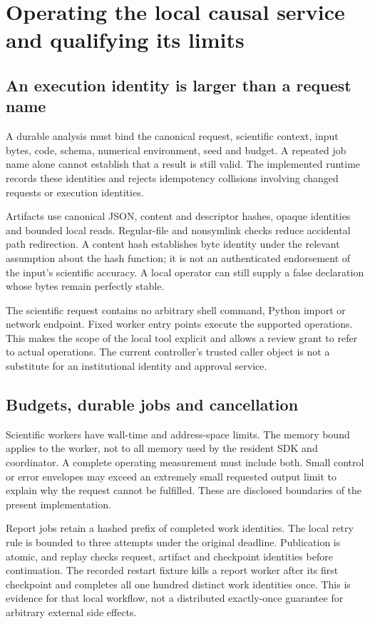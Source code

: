 \chapter{Operating the local causal service and qualifying its limits}
\label{in:operations}

\section{An execution identity is larger than a request name}

A durable analysis must bind the canonical request, scientific context, input
bytes, code, schema, numerical environment, seed and budget. A repeated job
name alone cannot establish that a result is still valid. The implemented
runtime records these identities and rejects idempotency collisions involving
changed requests or execution identities.~\citep{v12_in_runtime}

Artifacts use canonical JSON, content and descriptor hashes, opaque identities
and bounded local reads. Regular-file and nonsymlink checks reduce accidental
path redirection. A content hash establishes byte identity under the relevant
assumption about the hash function; it is not an authenticated endorsement of
the input's scientific accuracy. A local operator can still supply a false
declaration whose bytes remain perfectly stable.

The scientific request contains no arbitrary shell command, Python import or
network endpoint. Fixed worker entry points execute the supported operations.
This makes the scope of the local tool explicit and allows a review grant to
refer to actual operations. The current controller's trusted caller object is
not a substitute for an institutional identity and approval service.

\section{Budgets, durable jobs and cancellation}

Scientific workers have wall-time and address-space limits. The memory bound
applies to the worker, not to all memory used by the resident SDK and
coordinator. A complete operating measurement must include both. Small control
or error envelopes may exceed an extremely small requested output limit to
explain why the request cannot be fulfilled. These are disclosed boundaries of
the present implementation.~\citep{v12_in_runtime}

Report jobs retain a hashed prefix of completed work identities. The local
retry rule is bounded to three attempts under the original deadline. Publication
is atomic, and replay checks request, artifact and checkpoint identities before
continuation. The recorded restart fixture kills a report worker after its
first checkpoint and completes all one hundred distinct work identities once.
This is evidence for that local workflow, not a distributed exactly-once
guarantee for arbitrary external side effects.

